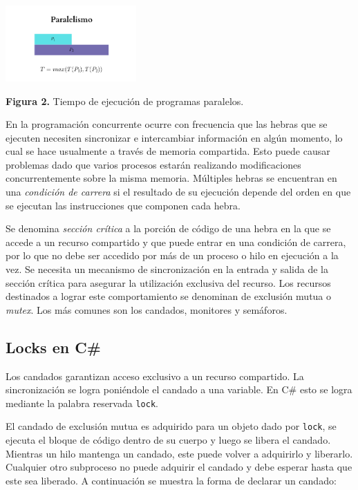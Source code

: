 \documentclass[10pt]{article} %
\newcommand{\csl}[1]{\colorbox{backcolour}{\texttt{#1}}}
\newcommand{\imgcaption}[2]{\tiny \textbf{Figura #1.} #2.}
\begin{document}
\begin{center}
	\includegraphics[width=5cm]{paralelismo.png}
	
	\imgcaption{2}{Tiempo de ejecuci\'on de programas paralelos}
\end{center}

En la programaci\'on concurrente ocurre con frecuencia que las hebras que se ejecuten necesiten sincronizar e intercambiar informaci\'on en alg\'un momento, lo cual se hace usualmente a trav\'es de memoria compartida. Esto puede causar problemas dado que varios procesos estar\'an realizando modificaciones concurrentemente sobre la misma memoria. M\'ultiples hebras se encuentran en una \textit{condici\'on de carrera} si el resultado de su ejecuci\'on depende del orden en que se ejecutan las instrucciones que componen cada hebra. 

Se denomina \textit{sección crítica} a la porción de código de una hebra en la que se accede a un recurso compartido y que puede entrar en una condici\'on de carrera, por lo que no debe ser accedido por más de un proceso o hilo en ejecución a la vez. Se necesita un mecanismo de sincronización en la entrada y salida de la sección crítica para asegurar la utilización exclusiva del recurso. Los recursos destinados a lograr este comportamiento se denominan de exclusi\'on mutua o \textit{mutex}. Los m\'as comunes son los candados, monitores y semáforos.

\subsection{Locks en C\#}

Los candados garantizan acceso exclusivo a un recurso compartido. La sincronizaci\'on se logra poni\'endole el candado a una variable. En C\# esto se logra mediante la palabra reservada \csl{lock}. 

El candado de exclusi\'on mutua es adquirido para un objeto dado por \csl{lock}, se ejecuta el bloque de c\'odigo dentro de su cuerpo y luego se libera el candado. Mientras un hilo mantenga un candado, este puede volver a adquirirlo y liberarlo. Cualquier otro subproceso no puede adquirir el candado y debe esperar hasta que este sea liberado. A continuaci\'on se muestra la forma de declarar un candado:
\end{document}
